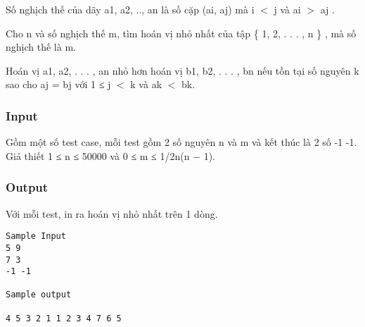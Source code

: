 

Số nghịch thế của dãy a1, a2, .., an là số cặp (ai, aj) mà i $<$ j và ai $>$ aj .

Cho n và số nghịch thế m, tìm hoán vị nhỏ nhất của tập \{ 1, 2, . . . , n \} , mà số nghịch thế là m.

Hoán vị a1, a2, . . . , an nhỏ hơn hoán vị b1, b2, . . . , bn nếu tồn tại số nguyên k sao cho aj = bj với 1 ≤ j $<$ k và ak $<$ bk.

\subsubsection{Input}

Gồm một số test case, mỗi test gồm 2 số nguyên n và m và kết thúc là 2 số -1 -1.
\\Giả thiết 1 ≤ n ≤ 50000 và 0 ≤ m ≤ 1/2n(n − 1).

\subsubsection{Output}

Với mỗi test, in ra hoán vị nhỏ nhất trên 1 dòng.
\begin{verbatim}
Sample Input
5 9
7 3
-1 -1

Sample output

4 5 3 2 1 1 2 3 4 7 6 5\end{verbatim}